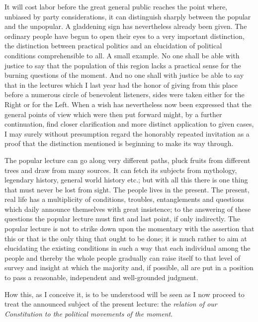 \documentclass[12pt,a4paper,openany]{book}
\newcommand{\opage}[1]{\marginnote{\footnotesize\textit{[#1]}}}
\begin{document}
It will cost labor before the great general public
reaches the point where, unbiased by party considerations, it can
distinguish sharply between the popular and the unpopular.
A gladdening sign has nevertheless already been given. The ordinary
people have begun to open their eyes to a very
important distinction, the distinction between practical politics
and an elucidation of political conditions comprehensible to all. A
small example. No one shall be able with justice to say that
the population of this region lacks a practical sense for
the burning questions of the moment. And no one shall
with justice be able to say that in the lectures which I last
year had the honor of giving from this place before
a numerous circle of benevolent listeners, sides were taken
either for the Right or for the Left. When a wish has
nevertheless now been expressed that the general points of view
which were then put forward might, by a further
continuation, find closer clarification and more distinct
application to given cases, I may surely
without presumption regard the honorably repeated invitation
as a proof that the distinction mentioned
is beginning to make its way through.

The popular lecture can go along very different
paths, pluck fruits from different trees and
draw from many sources. It can fetch its subjects from
mythology, legendary history, general world history %
etc.; but with all this there is one thing that must never
\setcounter{footnote}{0}%
\opage{5}be lost from sight. The people lives in the present.
The present, real life has a multiplicity
of conditions, troubles, entanglements and questions
which daily announce themselves with great insistence; to
the answering of these questions the popular lecture must
first and last point, if only indirectly.
The popular lecture is not to strike down upon the momentary
with the assertion that this or that is
the only thing that ought to be done; it is much rather to aim
at elucidating the existing conditions in such a way
that each individual among the people and thereby the whole people gradually
can raise itself to that level of survey and
insight at which the majority and, if possible, all are put in
a position to pass a reasonable, independent and well-grounded
judgment.

How this, as I conceive it, is to be
understood will be seen as I now proceed to
treat the announced subject of the present lecture: the
\emph{relation of our Constitution to the political
movements of the moment}.
\end{document}
